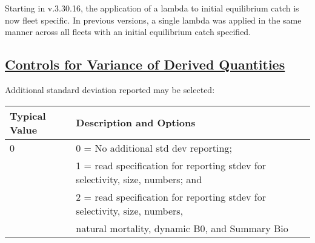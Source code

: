 Starting in v.3.30.16, the application of a lambda to initial equilibrium catch is now fleet specific. In previous versions, a single lambda was applied in the same manner across all fleets with an initial equilibrium catch specified.

\hypertarget{ControlsVarDer}{}
\subsection[Controls for Variance of Derived Quantities]{\protect\hyperlink{ControlsVarDer}{Controls for Variance of Derived Quantities}}
Additional standard deviation reported may be selected:

\begin{longtable}{p{1.1cm} p{1.4cm} p{1.2cm} p{1.2cm} p{1.3cm} p{1.6cm} p{1.4cm} p{1.4cm} p{1.4cm}}

	\hline
	\multicolumn{3}{l}{Typical Value} & \multicolumn{6}{l}{Description and Options} \Tstrut\Bstrut\\
	\hline
	\endfirsthead


	\multicolumn{3}{l}{0} & \multicolumn{6}{l}{0 = No additional std dev reporting;} \Tstrut\\
	\multicolumn{3}{l}{ } & \multicolumn{6}{l}{1 = read specification for reporting stdev for selectivity, size, numbers; and} \Bstrut\\
	\multicolumn{3}{l}{ } & \multicolumn{6}{l}{2 = read specification for reporting stdev for selectivity, size, numbers,} \Bstrut\\
	\multicolumn{3}{l}{ } & \multicolumn{6}{l}{natural mortality, dynamic B0, and Summary Bio} \Bstrut\\
	\hline

\end{longtable}


